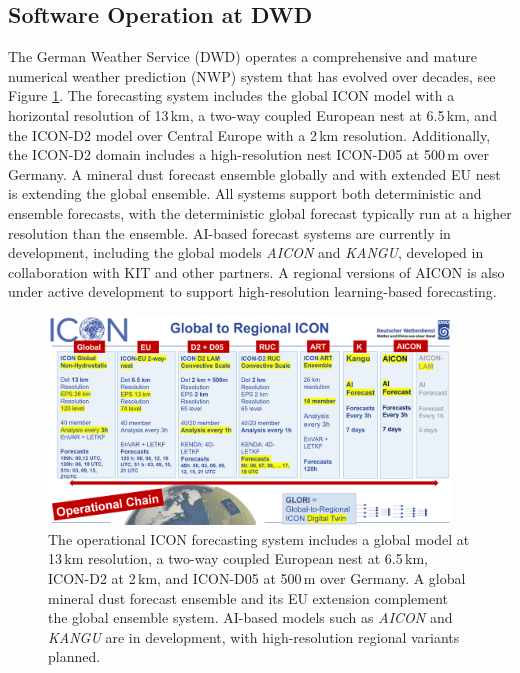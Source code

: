 \subsection{Software Operation at DWD}

The German Weather Service (DWD) operates a comprehensive and mature numerical weather prediction (NWP) system that has evolved over decades, see Figure \ref{fig:icon_operational_chain}. The forecasting system includes the global ICON model with a horizontal resolution of 13\,km, 
a two-way coupled European nest at 6.5\,km, and the ICON-D2 model over Central Europe with a 2\,km resolution. 
Additionally, the ICON-D2 domain includes a high-resolution nest ICON-D05 at 500\,m over Germany. A mineral dust forecast ensemble globally and with extended EU nest is extending the global ensemble.
All systems support both deterministic and ensemble forecasts, with the deterministic global forecast typically run at a higher resolution than the ensemble. 
AI-based forecast systems are currently in development, including the global models \emph{AICON} and \emph{KANGU}, developed in collaboration with KIT and other partners.
A regional versions of AICON is also under active development to support high-resolution learning-based forecasting.

\begin{figure}[ht]
	\centering
	\includegraphics[width=0.95\textwidth]{images/icon_operational_chain01.png}
	\caption{The operational ICON forecasting system includes a global model at 13\,km resolution, a two-way coupled European nest at 6.5\,km, ICON-D2 at 2\,km, and ICON-D05 at 500\,m over Germany. A global mineral dust forecast ensemble and its EU extension complement the global ensemble system. AI-based models such as \emph{AICON} and \emph{KANGU} are in development, with high-resolution regional variants planned.}
	\label{fig:icon_operational_chain}
\end{figure}


